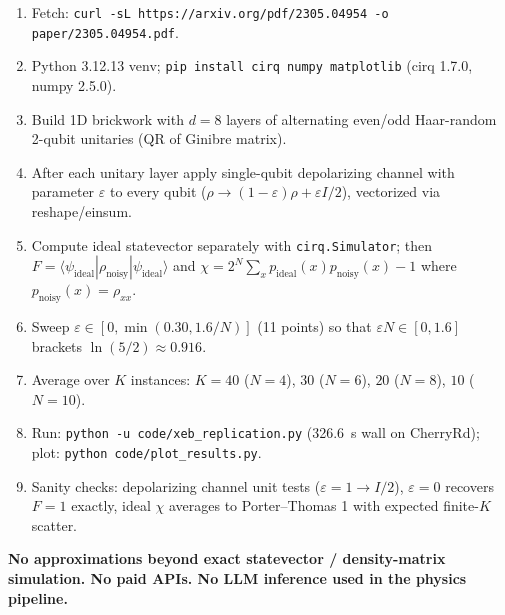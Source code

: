 \documentclass[11pt]{article}
\begin{document}
\begin{enumerate}
\item Fetch: \texttt{curl -sL https://arxiv.org/pdf/2305.04954 -o paper/2305.04954.pdf}.
\item Python 3.12.13 venv; \texttt{pip install cirq numpy matplotlib}
      (cirq 1.7.0, numpy 2.5.0).
\item Build 1D brickwork with $d=8$ layers of alternating even/odd Haar-random 2-qubit unitaries
      (QR of Ginibre matrix).
\item After each unitary layer apply single-qubit depolarizing channel with parameter $\varepsilon$
      to every qubit ($\rho \to (1-\varepsilon)\rho + \varepsilon I/2$), vectorized via
      reshape/einsum.
\item Compute ideal statevector separately with \texttt{cirq.Simulator}; then
      $F = \langle\psi_\text{ideal}|\rho_\text{noisy}|\psi_\text{ideal}\rangle$ and
      $\chi = 2^N \sum_x p_\text{ideal}(x) p_\text{noisy}(x) - 1$ where
      $p_\text{noisy}(x)=\rho_{xx}$.
\item Sweep $\varepsilon \in [0,\min(0.30, 1.6/N)]$ (11 points) so that $\varepsilon N \in [0,1.6]$
      brackets $\ln(5/2)\approx 0.916$.
\item Average over $K$ instances: $K=40$ ($N=4$), $30$ ($N=6$), $20$ ($N=8$), $10$ ($N=10$).
\item Run: \texttt{python -u code/xeb\_replication.py} (326.6~s wall on CherryRd);
      plot: \texttt{python code/plot\_results.py}.
\item Sanity checks: depolarizing channel unit tests ($\varepsilon=1\to I/2$),
      $\varepsilon=0$ recovers $F=1$ exactly, ideal $\chi$ averages to Porter--Thomas 1 with
      expected finite-$K$ scatter.
\end{enumerate}

\textbf{No approximations beyond exact statevector / density-matrix simulation. No paid APIs. No
LLM inference used in the physics pipeline.}
\end{document}
